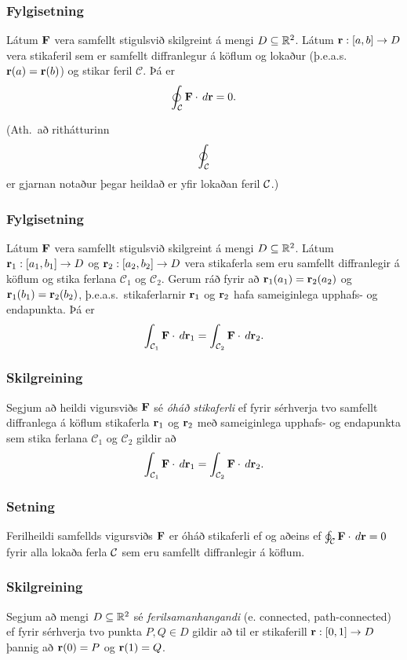 \subsubsection{Fylgisetning \rtask{}} %
Látum $\mbox{${\bf F}$}$ vera samfellt stigulsvið
skilgreint á mengi $D\subseteq {\mathbb R}^2$.   Látum $\mbox{${\bf r}$}:[a,b]\rightarrow D$ vera
stikaferil sem er samfellt diffranlegur á köflum og lokaður (þ.e.a.s. $\mbox{${\bf r}$}(a)=\mbox{${\bf r}$}(b)$) og stikar feril $\mathcal{C}$.  Þá er $$\oint_{\cal C}  \mbox{${\bf F}$}\cdot \,d\mbox{${\bf r}$}=0.$$

(Ath.~að rithátturinn $$\oint_{\cal C}$$ er gjarnan notaður þegar heildað er yfir lokaðan feril $\cal C$.)




\subsubsection{Fylgisetning \rtask{}}
Látum $\mbox{${\bf F}$}$ vera samfellt stigulsvið
skilgreint á mengi $D\subseteq {\mathbb R}^2$.   Látum
$\mbox{${\bf r}$}_1:[a_1,b_1]\rightarrow D$ og $\mbox{${\bf r}$}_2:[a_2,b_2]\rightarrow D$ vera
stikaferla sem eru samfellt diffranlegir á köflum og stika ferlana $\mathcal{C}_1$ og $\mathcal{C}_2$.  Gerum ráð fyrir
að $\mbox{${\bf r}$}_1(a_1)=\mbox{${\bf r}$}_2(a_2)$ og $\mbox{${\bf r}$}_1(b_1)=\mbox{${\bf r}$}_2(b_2)$, þ.e.a.s.\ stikaferlarnir $\mbox{${\bf r}$}_1$ og $\mbox{${\bf r}$}_2$ hafa sameiginlega upphafs- og endapunkta.   Þá er  
$$\int_{{\cal C}_1} \mbox{${\bf F}$}\cdot\,d\mbox{${\bf r}$}_1=\int_{{\cal C}_2} \mbox{${\bf F}$}\cdot\,d\mbox{${\bf r}$}_2.$$ 
 


\subsubsection{Skilgreining \rtask{}}
 Segjum að heildi vigursviðs $\mbox{${\bf F}$}$ sé {\em
  óháð stikaferli} ef fyrir sérhverja tvo samfellt diffranlega á
köflum stikaferla $\mbox{${\bf r}$}_1$ og $\mbox{${\bf r}$}_2$ með sameiginlega upphafs- og
endapunkta sem stika ferlana $\mathcal{C}_1$ og $\mathcal{C}_2$ gildir að  
$$\int_{{\cal C}_1} \mbox{${\bf F}$}\cdot\,d\mbox{${\bf r}$}_1=
\int_{{\cal C}_2} \mbox{${\bf F}$}\cdot\,d\mbox{${\bf r}$}_2.$$ 



\subsubsection{Setning }
  Ferilheildi samfellds vigursviðs $\mbox{${\bf F}$}$ er óháð
stikaferli ef og aðeins ef $\oint_{\cal C} \mbox{${\bf F}$}\cdot\,d\mbox{${\bf r}$}=0$ fyrir alla
lokaða ferla $\cal C$ sem eru samfellt diffranlegir á köflum. 



\subsubsection{Skilgreining \rtask{}}
   Segjum að mengi $D\subseteq {\mathbb R}^2$ sé {\em
  ferilsamanhangandi} (e. connected, path-connected)  ef fyrir
  sérhverja tvo punkta $P, Q\in D$ gildir 
að til er stikaferill $\mbox{${\bf r}$}:[0,1]\rightarrow D$ þannig að $\mbox{${\bf r}$}(0)=P$ og
$\mbox{${\bf r}$}(1)=Q$.

